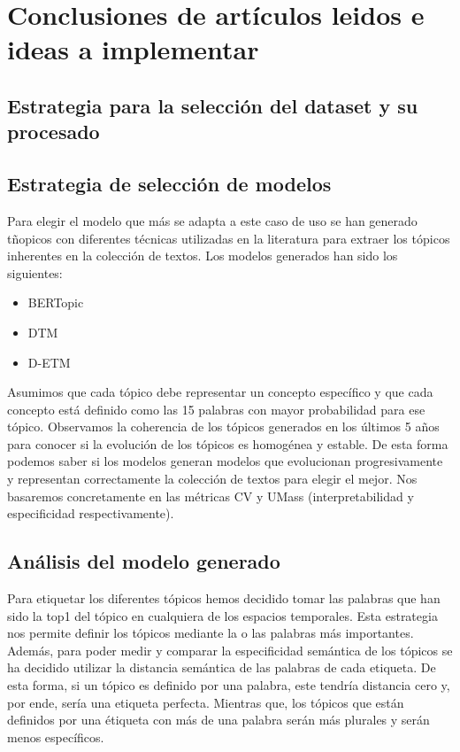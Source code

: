 \documentclass[a4paper,10pt]{article}
\title{}
\author{}
\begin{document}
\maketitle

\begin{abstract}

\end{abstract}

\section{Conclusiones de artículos leidos e ideas a implementar}

\subsection{Estrategia para la selección del dataset y su procesado}

\subsection{Estrategia de selección de modelos}
Para elegir el modelo que más se adapta a este caso de uso se han generado tñopicos con diferentes técnicas utilizadas en la literatura para extraer los tópicos inherentes en la colección de textos. Los modelos generados han sido los siguientes:
\begin{itemize}
 \item BERTopic
 \item DTM
 \item D-ETM
\end{itemize}

Asumimos que cada tópico debe representar un concepto específico y que cada concepto está definido como las 15 palabras con mayor probabilidad para ese tópico. Observamos la coherencia de los tópicos generados en los últimos 5 años para conocer si la evolución de los tópicos es homogénea y estable. De esta forma podemos saber si los modelos generan modelos que evolucionan progresivamente y representan correctamente la colección de textos para elegir el mejor. Nos basaremos concretamente en las métricas CV y UMass (interpretabilidad y especificidad respectivamente).

\subsection{Análisis del modelo generado}

Para etiquetar los diferentes tópicos hemos decidido tomar las palabras que han sido la top1 del tópico en cualquiera de los espacios temporales. Esta estrategia nos permite definir los tópicos mediante la o las palabras más importantes. Además, para poder medir y comparar la especificidad semántica de los tópicos se ha decidido utilizar la distancia semántica de las palabras de cada etiqueta. De esta forma, si un tópico es definido por una palabra, este tendría distancia cero y, por ende, sería una etiqueta perfecta. Mientras que, los tópicos que están definidos por una étiqueta con más de una palabra serán más plurales y serán menos específicos.
\end{document}
